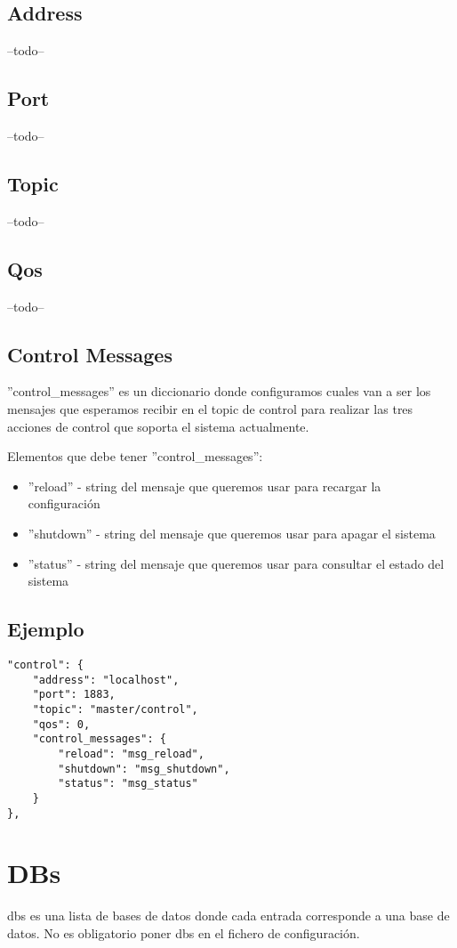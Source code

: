 \documentclass[12pt, a4paper, oneside, titlepage]{article}
\begin{document}
\subsection{Address}
--todo--
\subsection{Port}
--todo--
\subsection{Topic}
--todo--
\subsection{Qos}
--todo--
\subsection{Control Messages}
''control\_messages'' es un diccionario donde configuramos cuales van a ser los mensajes que esperamos recibir en el topic de control para realizar las tres acciones de control que soporta el sistema actualmente.
 
Elementos que debe tener ''control\_messages'':
\begin{itemize}
\item			''reload'' - string del mensaje que queremos usar para recargar la configuración
\item			''shutdown'' - string del mensaje que queremos usar para apagar el sistema
\item			''status'' - string del mensaje que queremos usar para consultar el estado del sistema
\end{itemize}

\subsection{Ejemplo}
\begin{lstlisting}
"control": { 
	"address": "localhost",
	"port": 1883,	
	"topic": "master/control",
	"qos": 0, 
	"control_messages": { 
		"reload": "msg_reload",
		"shutdown": "msg_shutdown",
		"status": "msg_status"
	}
},
\end{lstlisting}


\section{DBs}

dbs es una lista de bases de datos donde cada entrada corresponde a una base de datos. No es obligatorio poner dbs en el fichero de configuración.
\end{document}
